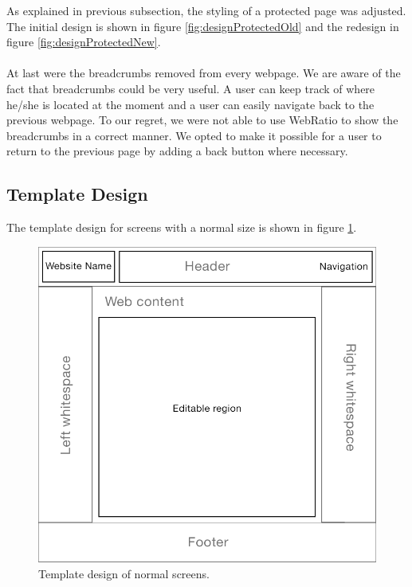\documentclass[a4paper]{report}
\begin{document}
{As explained in previous subsection, the styling of a protected page was adjusted. The initial design is shown in figure \ref{fig:designProtectedOld} and the redesign in figure \ref{fig:designProtectedNew}.
\\ \\
At last were the breadcrumbs removed from every webpage. We are aware of the fact that breadcrumbs could be very useful. A user can keep track of where he/she is located at the moment and a user can easily navigate back to the previous webpage. To our regret, we were not able to use WebRatio to show the breadcrumbs in a correct manner. We opted to make it possible for a user to return to the previous page by adding a back button where necessary.

\subsection{Template Design}
The template design for screens with a normal size is shown in figure \ref{fig:templateDesignNormal}.
\begin{figure}[h]
    \centering
    \includegraphics[width=.6\textwidth]{templateDesign/templateDesignNormal}
    \caption{Template design of normal screens.}
    \label{fig:templateDesignNormal}
\end{figure}

}
\end{document}
